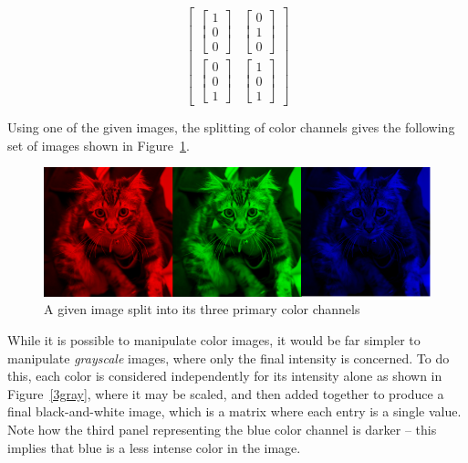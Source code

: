     \[
      \begin{bmatrix}
        \begin{bmatrix}1\\0\\0\end{bmatrix}
        &
        \begin{bmatrix}0\\1\\0\end{bmatrix}\\[2em]
        \begin{bmatrix}0\\0\\1\end{bmatrix}
        &
        \begin{bmatrix}1\\0\\1\end{bmatrix}
      \end{bmatrix}
    \]

Using one of the given images, the splitting of color channels gives the following set of images shown in Figure~\ref{3color}.

    \begin{figure}[ht]
      \centering
      \includegraphics[scale=0.4]{./img/photo2-exploded.png}
      \caption{A given image split into its three primary color channels}
      \label{3color}
    \end{figure}

While it is possible to manipulate color images, it would be far simpler to manipulate \emph{grayscale} images, where only the final intensity is concerned.  To do this, each color is considered independently for its intensity alone as shown in Figure~\ref{3gray}, where it may be scaled, and then added together to produce a final black-and-white image, which is a matrix where each entry is a single value.  Note how the third panel representing the blue color channel is darker -- this implies that blue is a less intense color in the image.

